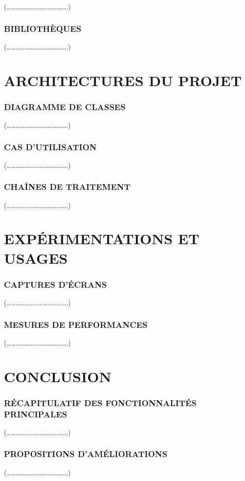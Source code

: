 \documentclass[a4paper]{article} %
\begin{document}
(………………………………….)
\subsubsection{BIBLIOTHÈQUES}

(………………………………….)

\section{ARCHITECTURES DU PROJET }
\subsubsection{DIAGRAMME DE CLASSES }

(………………………………….)
\subsubsection{ CAS D’UTILISATION}

(………………………………….)
\subsubsection{CHAÎNES DE TRAITEMENT }

(………………………………….)


\section{EXPÉRIMENTATIONS ET USAGES }
\subsubsection{CAPTURES D’ÉCRANS }


(………………………………….)
\subsubsection{ MESURES DE PERFORMANCES }

(………………………………….)

\section{CONCLUSION}
\subsubsection{RÉCAPITULATIF DES FONCTIONNALITÉS PRINCIPALES }

(………………………………….)
\subsubsection{PROPOSITIONS D’AMÉLIORATIONS }

(………………………………….)
\end{document}
